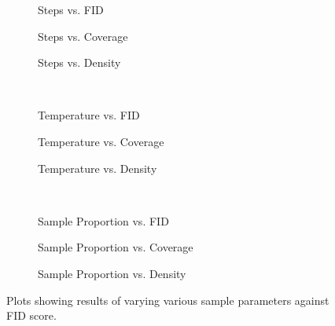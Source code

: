 \begin{figure}[ht!]
    \centering
    \begin{subfigure}[b]{0.33\textwidth}
        \centering
        \resizebox{\textwidth}{!}{
            
        }
        \caption{Steps vs. FID}
    \end{subfigure}
    \hfill
    \begin{subfigure}[b]{0.33\textwidth}
        \centering
        \resizebox{\textwidth}{!}{
            
        }
        \caption{Steps vs. Coverage}
    \end{subfigure}
    \hfill
    \begin{subfigure}[b]{0.33\textwidth}
        \centering
        \resizebox{\textwidth}{!}{
            
        }
        \caption{Steps vs. Density}
    \end{subfigure}
    \\
    \begin{subfigure}[b]{0.33\textwidth}
        \centering
        \resizebox{\textwidth}{!}{
            
        }
        \caption{Temperature vs. FID}
    \end{subfigure}
    \hfill
    \begin{subfigure}[b]{0.33\textwidth}
        \centering
        \resizebox{\textwidth}{!}{
            
        }
        \caption{Temperature vs. Coverage}
    \end{subfigure}
    \hfill
    \begin{subfigure}[b]{0.33\textwidth}
        \centering
        \resizebox{\textwidth}{!}{
            
        }
        \caption{Temperature vs. Density}
    \end{subfigure}
    \\
    \begin{subfigure}[b]{0.33\textwidth}
        \centering
        \resizebox{\textwidth}{!}{
            
        }
        \caption{Sample Proportion vs. FID}
    \end{subfigure}
    \hfill
    \begin{subfigure}[b]{0.33\textwidth}
        \centering
        \resizebox{\textwidth}{!}{
            
        }
        \caption{Sample Proportion vs. Coverage}
    \end{subfigure}
    \hfill
    \begin{subfigure}[b]{0.33\textwidth}
        \centering
        \resizebox{\textwidth}{!}{
            
        }
        \caption{Sample Proportion vs. Density}
    \end{subfigure}
\caption{Plots showing results of varying various sample parameters against FID
score.}
\end{figure}

